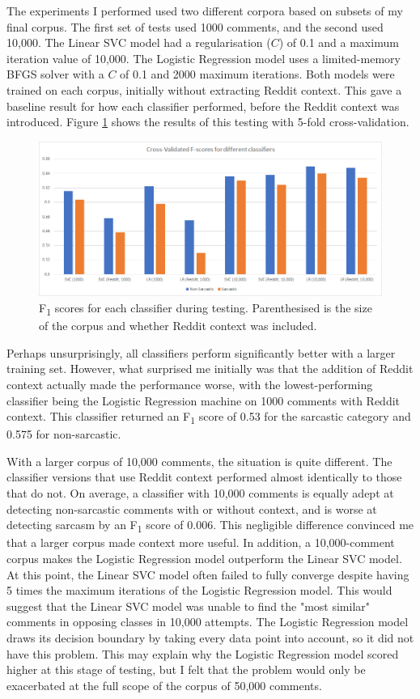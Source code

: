 \documentclass[a4paper,12pt]{article}
\begin{document}
The experiments I performed used two different corpora based on subsets of my final corpus. The first set of tests used 1000 comments, and the second used 10,000. The Linear SVC model had a regularisation ($C$) of 0.1 and a maximum iteration value of 10,000. The Logistic Regression model uses a limited-memory BFGS solver with a $C$ of 0.1 and 2000 maximum iterations. Both models were trained on each corpus, initially without extracting Reddit context. This gave a baseline result for how each classifier performed, before the Reddit context was introduced. Figure \ref{fig:cmd5} shows the results of this testing with 5-fold cross-validation.

\begin{figure}[h!]
\includegraphics[width=\linewidth]{Figures/classification_report.png}
\caption{F\textsubscript{1} scores for each classifier during testing. Parenthesised is the size of the corpus and whether Reddit context was included.}
\label{fig:cmd5}
\end{figure}

Perhaps unsurprisingly, all classifiers perform significantly better with a larger training set. However, what surprised me initially was that the addition of Reddit context actually made the performance worse, with the lowest-performing classifier being the Logistic Regression machine on 1000 comments with Reddit context. This classifier returned an F\textsubscript{1} score of 0.53 for the sarcastic category and 0.575 for non-sarcastic.

With a larger corpus of 10,000 comments, the situation is quite different. The classifier versions that use Reddit context performed almost identically to those that do not. On average, a classifier with 10,000 comments is equally adept at detecting non-sarcastic comments with or without context, and is worse at detecting sarcasm by an F\textsubscript{1} score of 0.006. This negligible difference convinced me that a larger corpus made context more useful. In addition, a 10,000-comment corpus makes the Logistic Regression model outperform the Linear SVC model. At this point, the Linear SVC model often failed to fully converge despite having 5 times the maximum iterations of the Logistic Regression model. This would suggest that the Linear SVC model was unable to find the "most similar" comments in opposing classes in 10,000 attempts. The Logistic Regression model draws its decision boundary by taking every data point into account, so it did not have this problem. This may explain why the Logistic Regression model scored higher at this stage of testing, but I felt that the problem would only be exacerbated at the full scope of the corpus of 50,000 comments.
\end{document}
